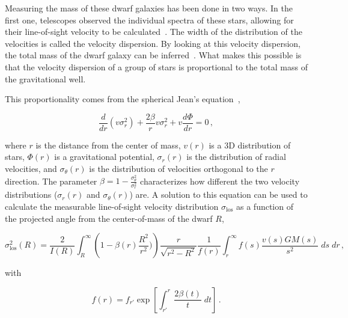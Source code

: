 Measuring the mass of these dwarf galaxies has been done in two ways.
In the first one, telescopes observed the individual spectra of these stars, allowing for their line-of-sight velocity to be calculated~\cite{dwarf_gal_red_giant}.
The width of the distribution of the velocities is called the velocity dispersion.
By looking at this velocity dispersion, the total mass of the dwarf galaxy can be inferred~\cite{dwarf_gal_vel_dispersion, dwarf_gal_vel_dispersion2}.
What makes this possible is that the velocity dispersion of a group of stars is proportional to the total mass of the gravitational well.

This proportionality comes from the spherical Jean's equation~\cite{galactic_dynamics},

\begin{equation}\label{eqn:jeans}
  \frac{d}{dr} \left ( v \sigma_r^2\right) + \frac{2 \beta}{r}v \sigma_r^2 + v \frac{d \Phi}{dr}=0 \,,
\end{equation}

where $r$ is the distance from the center of mass, $v(r)$ is a 3D distribution of stars, $\Phi(r)$ is a gravitational potential, $\sigma_r(r)$ is the distribution of radial velocities, and $\sigma_\theta(r)$ is the distribution of velocities orthogonal to the $r$ direction.
The parameter $\beta = 1 - \frac{\sigma_{\theta}^2}{\sigma_r^2}$ characterizes how different the two velocity distributions ($\sigma_r(r)$ and $\sigma_{\theta}(r)$) are.
A solution to this equation can be used to calculate the measurable line-of-sight velocity distribution $\sigma_{\mathrm{los}}$ as a function of the projected angle from the center-of-mass of the dwarf $R$, 

\begin{equation}\label{eqn:los_velocity_dist}
  \sigma_{\mathrm{los}}^2 \left ( R \right ) = \frac{2}{I(R)} \int_R^{\infty} \left ( 1 - \beta(r) \frac{R^2}{r^2}) \right ) \frac{r}{\sqrt{r^2-R^2}} \frac{1}{f(r)} \int_r^\infty f(s) \frac{v(s)GM(s)}{s^2} \; ds\; dr \,,
\end{equation}

with

\begin{equation}\label{eqn:los_velocity_dist2}
  f(r) = f_{r'} \exp \left [ \int_{r'}^r \frac{2 \beta(t) }{t} \; dt \right ] \, .
\end{equation}

